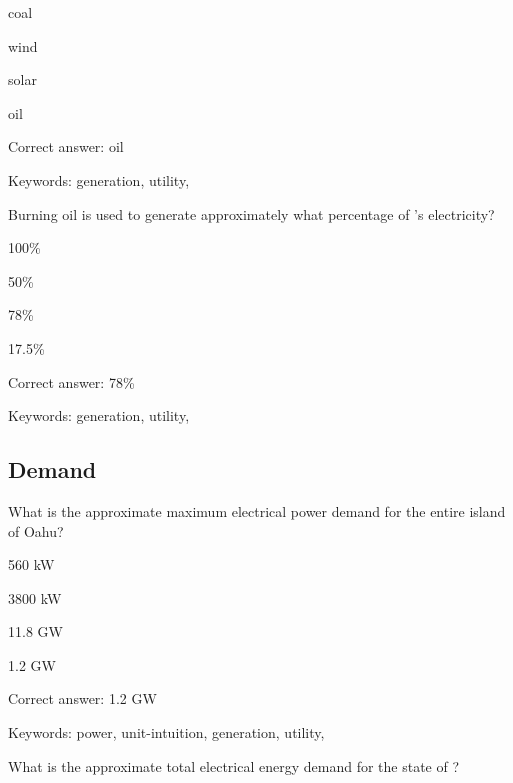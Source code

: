 \begin{answer}
	\item coal
	\item wind
	\item solar
	\item oil
\end{answer}

Correct answer: oil

Keywords: generation, utility, \Hawaii

\begin{question}
	\item Burning oil is used to generate approximately what percentage of \Hawaii's electricity?
\end{question}

\begin{answer}
	\item 100\%
	\item 50\%
	\item 78\%
	\item 17.5\%
\end{answer}

Correct answer: 78\%

Keywords: generation, utility, \Hawaii

\subsection{Demand}

\begin{question}
	\item What is the approximate maximum electrical power demand for the entire island of Oahu?
\end{question}

\begin{answer}
	\item 560 kW
	\item 3800 kW
	\item 11.8 GW
	\item 1.2 GW
\end{answer}

Correct answer: 1.2 GW

Keywords: power, unit-intuition, generation, utility, \Hawaii

\begin{question}
	\item What is the approximate total electrical energy demand for the state of \Hawaii?
\end{question}


